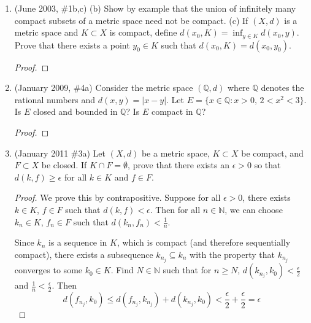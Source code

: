 \documentclass[reqno]{article}
\theoremstyle{remark}
\numberwithin{equation}{section}
\newcommand{\N}{\mathbb{N}}
\begin{document}
\begin{enumerate}
\begin{enumerate}
\begin{proof}
Therefore $d_{M \times N}((s_{n_{k_j}},t_{n_{k_j}}),(s_0,t_0))< \epsilon.$

Hence $\{(s_{n_{k_j}},t_{n_{k_j}})$ converges to $(s_0,t_0).$ Therefore $S \times T$ is sequentially compact and $S \times T$ is therefore compact.


\end{proof} 
	
\end{enumerate} 
	
\item (June 2003, \#1b,c) (b) Show by example that the union of infinitely many compact subsets of a metric space need not be compact. (c) If $(X,d)$ is a metric space and $K\subset X$ is compact, define $d(x_0,K)=\inf_{y\in K} d(x_0,y)$. Prove that there exists a point $y_0\in K$ such that $d(x_0,K)=d(x_0,y_0)$.

\begin{proof} 

\end{proof} 
		
\item (January 2009, \#4a) Consider the metric space $(\mathbb{Q},d)$ where $\mathbb{Q}$ denotes the rational numbers and $d(x,y)=|x-y|$. Let $E=\{x\in\mathbb{Q}:x>0,\,2<x^2<3\}$. Is $E$ closed and bounded in $\mathbb{Q}$?  Is $E$ compact in $\mathbb{Q}$? 

\begin{proof} 

\end{proof} 
	
\item (January 2011 \#3a) Let $(X,d)$ be a metric space, $K\subset X$ be compact, and $F\subset X$ be closed. If $K\cap F=\emptyset$, prove that there exists an $\epsilon>0$ so that $d(k,f)\geq \epsilon$ for all $k\in K$ and $f\in F$.

\begin{proof} 
We prove this by contrapositive. Suppose for all $\epsilon >0$, there exists $k \in K$, $f \in F$ such that $d(k,f)< \epsilon$. Then for all $n \in \N$, we can choose $k_n \in K$, $f_n \in F$ such that $d(k_n, f_n) < \frac{1}{n}$.

Since $k_n$ is a sequence in $K$, which is compact (and therefore sequentially compact), there exists a subsequence $k_{n_j} \subseteq k_n$ with the property that $k_{n_j}$ converges to some $k_0 \in K$. Find $N \in \N$ such that for $n \geq N$, $d(k_{n_j}, k_0) < \frac{\epsilon}{2}$ and $\frac{1}{n} < \frac{\epsilon}{2}$. Then
$$ d(f_{n_j}, k_0) \leq d(f_{n_j}, k_{n_j}) + d(k_{n_j}, k_0) < \frac{\epsilon}{2} + \frac{\epsilon}{2} = \epsilon$$


\end{proof}
\end{enumerate}
\end{document}
